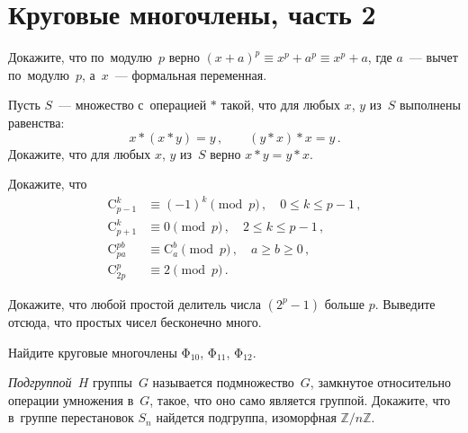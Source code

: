 
\section*{Круговые многочлены, часть 2}


\begingroup
    \def\binom#1#2{\mathrm{C}_{#1}^{#2}}%
    \def\cyclotomic{\mathrm{\Phi}}%

\begin{problems}

Докажите, что по~модулю~$p$ верно $(x + a)^p \equiv x^p + a^p \equiv x^p + a$,
где $a$~--- вычет по~модулю~$p$, а~$x$~--- формальная переменная.

\item
Пусть $S$~--- множество с~операцией $\ast$ такой, что для любых $x$, $y$ из~$S$
выполнены равенства:
\[
    x \ast (x \ast y) = y
\, , \qquad
    (y \ast x) \ast x = y
\, . \]
Докажите, что для любых $x$, $y$ из~$S$ верно $x \ast y = y \ast x$.

\item
Докажите, что
\begin{align*}
    \binom{p-1}{k} &\equiv (-1)^k \pmod{p}
\, , \quad
    0 \leq k \leq p - 1
\, , \\
    \binom{p+1}{k} &\equiv 0 \pmod{p}
\, , \quad
    2 \leq k \leq p - 1
\, , \\
    \binom{pa}{pb} &\equiv \binom{a}{b} \pmod{p}
\, , \quad
    a \geq b \geq 0
\, , \\
    \binom{2p}{p} &\equiv 2 \pmod{p}
\, . \end{align*}

\item
Докажите, что любой простой делитель числа $(2^p - 1)$ больше $p$.
Выведите отсюда, что простых чисел бесконечно много.

\item
Найдите круговые многочлены $\cyclotomic_{10}$, $\cyclotomic_{11}$,
$\cyclotomic_{12}$.

\item
\emph{Подгруппой~$H$} группы~$G$ называется подмножество~$G$, замкнутое
относительно операции умножения в~$G$, такое, что оно само является группой.
Докажите, что в~группе перестановок $S_n$ найдется подгруппа, изоморфная
$\mathbb{Z} / n \mathbb{Z}$.

\end{problems}

\endgroup %

